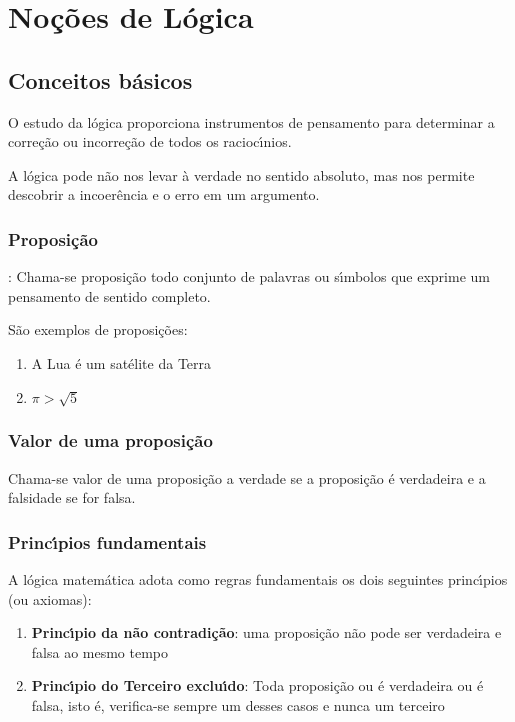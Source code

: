\chapter{No{\c c}{\~o}es de L{\'o}gica}

\section{Conceitos b{\'a}sicos}

\hspace{0,5cm}O estudo da l{\'o}gica proporciona instrumentos de pensamento para determinar a corre{\c c}{\~a}o ou incorre{\c c}{\~a}o de todos os racioc{\'\i}nios.

A l{\'o}gica pode n{\~a}o nos levar {\`a} verdade no sentido absoluto, mas nos permite descobrir a incoer{\^e}ncia e o erro em um argumento.

\subsection{Proposi{\c c}{\~a}o}

\begin{definicao}[Proposi{\c c}{\~a}o]: Chama-se proposi{\c c}{\~a}o todo conjunto de palavras ou s{\'\i}mbolos que exprime um pensamento de sentido completo.
\end{definicao}

S{\~a}o exemplos de proposi{\c c}{\~o}es:
\begin{enumerate}
\item A Lua {\'e} um sat{\'e}lite da Terra
\item $\pi>\sqrt{5}$
\end{enumerate}

\subsection{Valor de uma proposi{\c c}{\~a}o}
\begin{definicao}Chama-se valor de uma proposi{\c c}{\~a}o a verdade se a proposi{\c c}{\~a}o {\'e} verdadeira e a falsidade se for falsa.\end{definicao}

\subsection{Princ{\'\i}pios fundamentais}
A l{\'o}gica matem{\'a}tica adota como regras fundamentais os dois seguintes princ{\'\i}pios (ou axiomas):
\begin{enumerate}
\item \textbf{Princ{\'\i}pio da n{\~a}o contradi{\c c}{\~a}o}: uma proposi{\c c}{\~a}o n{\~a}o pode ser verdadeira e falsa ao mesmo tempo
\item \textbf{Princ{\'\i}pio do Terceiro exclu{\'\i}do}: Toda proposi{\c c}{\~a}o ou {\'e} verdadeira ou {\'e} falsa, isto {\'e}, verifica-se sempre um desses casos e nunca um terceiro
\end{enumerate}
